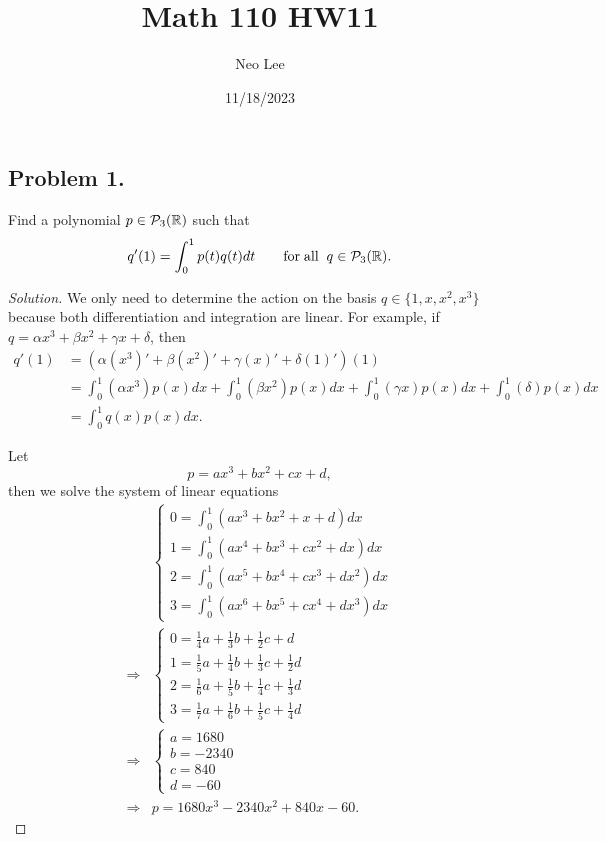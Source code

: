 \documentclass{article}
\title{Math 110 HW11}
\author{Neo Lee}
\date{11/18/2023}
\renewcommand*{\implies}{\ensuremath{\Longrightarrow}}
\newcommand*{\R}{\ensuremath{\mathbb{R}}}
\begin{document}
 

\maketitle 

\subsection*{Problem 1.}
Find a polynomial $p\in {\cal P}_3(\R)$ such that
$$q'(1)=\int_0^1 p(t) q(t) dt \qquad {\rm for \; all} \;\; q\in {\cal P}_3(\R).$$
\begin{proof}[Solution]
    We only need to determine the action on the basis $q\in\{1, x, x^2, x^3\}$ because both 
    differentiation and integration are linear. For example, if $q = \alpha x^3 + \beta x^2 + 
    \gamma x + \delta$, then 
    \begin{align*}
        q'(1) & = \left(\alpha(x^3)' + \beta(x^2)' + \gamma(x)' + \delta(1)'\right)(1) \\
        & = \int_{0}^{1}\left(\alpha x^3\right)p(x)dx + \int_{0}^{1}\left(\beta x^2\right)p(x)dx + 
        \int_{0}^{1}\left(\gamma x\right)p(x)dx + \int_{0}^{1}\left(\delta\right)p(x)dx \\
        & = \int_{0}^{1}q(x)p(x)dx.
    \end{align*}

    Let $$p = ax^3 + bx^2 + cx + d,$$
    then we solve the system of linear equations
    \begin{align*}
        & \begin{cases}
            0 = \int_{0}^{1}\left(ax^3 + bx^2 + x + d\right)dx \\
            1 = \int_{0}^{1}\left(ax^4 + bx^3 + cx^2 + dx\right) dx \\
            2 = \int_{0}^{1}\left(ax^5 + bx^4 + cx^3 + dx^2\right) dx \\
            3 = \int_{0}^{1}\left(ax^6 + bx^5 + cx^4 + dx^3\right) dx
        \end{cases} \\
        \implies & \begin{cases}
            0 = \frac{1}{4}a + \frac{1}{3}b + \frac{1}{2}c + d \\
            1 = \frac{1}{5}a + \frac{1}{4}b + \frac{1}{3}c + \frac{1}{2}d \\
            2 = \frac{1}{6}a + \frac{1}{5}b + \frac{1}{4}c + \frac{1}{3}d \\
            3 = \frac{1}{7}a + \frac{1}{6}b + \frac{1}{5}c + \frac{1}{4}d
        \end{cases} \\
        \implies & \begin{cases}
            a = 1680 \\
            b = -2340 \\
            c = 840 \\
            d = -60
        \end{cases} \\
        \implies & p = 1680x^3 - 2340x^2 + 840x - 60.
    \end{align*}
\end{proof}
\end{document}
